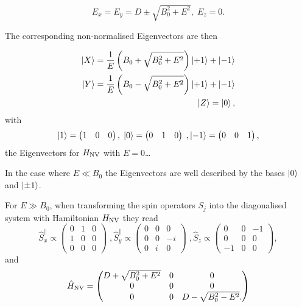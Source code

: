 \begin{equation}
    E_x = E_y = D \pm \sqrt{B_0^2  + E^2}, \; E_z = 0.
    \label{eq:reduced_H_NV_eigenvalues}
\end{equation}

The corresponding non-normalised Eigenvectors are then 

\begin{eqnarray}
    \ket{X} = \frac{1}{E} \left(B_0 + \sqrt{B_0^2 + E^2}\right) \ket{+1} + \ket{-1} \\ 
    \ket{Y} = \frac{1}{E} \left(B_0 - \sqrt{B_0^2 + E^2}\right) \ket{+1} + \ket{-1} \\ 
    \ket{Z} = \ket{0},
\end{eqnarray}
with
\begin{equation}
    \ket{1} = \begin{pmatrix}
        1 & 0 & 0 
    \end{pmatrix}, \; 
    \ket{0} = \begin{pmatrix}
        0 & 1 & 0 
    \end{pmatrix}\;, 
    \ket{-1} = \begin{pmatrix}
        0 & 0 & 1 
    \end{pmatrix},
    \label{eq:base_states}
\end{equation}
the Eigenvectors for $H_{\ce{NV}}$ with $E=0$\dots

In the case where $E \ll B_0$ the Eigenvectors are well described by the bases $\ket{0}$ and $\ket{\pm 1}$.

For $E \gg B_0$, when transforming the spin operators $S_j$ into the diagonalised system with Hamiltonian $H_{\ce{NV}}$ they read 
\begin{equation}
    \hat{S}_x^\parallel \propto \begin{pmatrix}
        0 & 1 & 0 \\ 
        1 & 0 & 0 \\ 
        0 & 0 & 0 
    \end{pmatrix} \; , 
    \hat{S}_y^\parallel \propto \begin{pmatrix}
        0 & 0 & 0 \\ 
        0 & 0 & -i \\ 
        0 & i & 0 
    \end{pmatrix} \; , 
    \hat{S}_z \propto \begin{pmatrix}
        0 & 0 & -1 \\ 
        0 & 0 & 0 \\ 
        -1 & 0 & 0 
    \end{pmatrix} , 
    \label{eq:diagonalised_spin_operators}
\end{equation}
and 
\begin{equation}
    \hat{H}_{\ce{NV}} = \begin{pmatrix}
        D + \sqrt{B_0^2 + E^2} & 0 & 0 \\ 
        0 & 0 & 0 \\ 
        0 & 0 & D - \sqrt{B_0^2 - E^2}. 
    \end{pmatrix} 
\end{equation}

